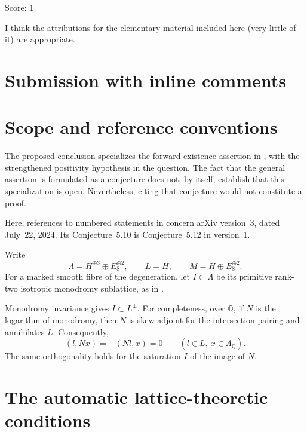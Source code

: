 \documentclass[11pt]{article}
\newcommand{\Q}{\mathbb Q}
\theoremstyle{remark}
\begin{document}
\noindent Score: 1

I think the attributions for the elementary material included here (very little of it) are appropriate.

\newpage
\section{Submission with inline comments}


\begin{abstract}
I cannot provide a complete proof of the assertion in the question.
The argument below establishes its lattice-theoretic prerequisites and
identifies the remaining geometric existence problem.  It is not a proof
of the requested theorem.
\end{abstract}

\section{Scope and reference conventions}

The proposed conclusion specializes the forward existence assertion in
\cite[Conjecture~5.10]{GT24}, with the strengthened positivity hypothesis
in the question.
The fact that the general assertion is formulated as a conjecture does
not, by itself, establish that this specialization is open.
Nevertheless, citing that conjecture would not constitute a proof.

Here, references to numbered statements in \cite{GT24} concern
arXiv version~3, dated July~22, 2024.  Its Conjecture~5.10 is
Conjecture~5.12 in version~1.

Write
\[
 \Lambda=H^{\oplus 3}\oplus E_8^{\oplus 2},
 \qquad L=H,
 \qquad M=H\oplus E_8^{\oplus 2}.
\]
For a marked smooth fibre of the degeneration, let
\(I\subset\Lambda\) be its primitive rank-two isotropic monodromy
sublattice, as in \cite[Section~3.1]{GT24}.

Monodromy invariance gives \(I\subset L^\perp\).
For completeness, over \(\Q\), if \(N\) is the logarithm of monodromy,
then \(N\) is skew-adjoint for the intersection pairing and annihilates
\(L\).  Consequently,
\[
 (l,Nx)=-(Nl,x)=0
 \qquad(l\in L,\ x\in\Lambda_\Q).
\]
The same orthogonality holds for the saturation \(I\) of the image of
\(N\).

\section{The automatic lattice-theoretic conditions}
\end{document}
